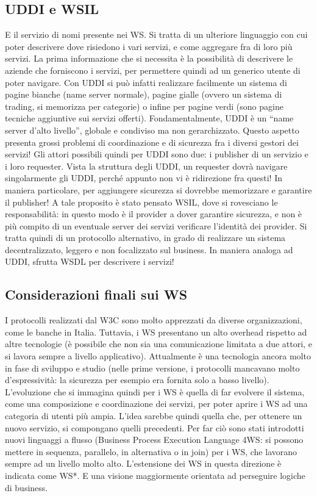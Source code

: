 \subsection{UDDI e WSIL}
E il servizio di nomi presente nei WS. Si tratta di un ulteriore linguaggio con cui poter descrivere dove risiedono i
vari servizi, e come aggregare fra di loro più servizi. La prima informazione che si necessita è la possibilità di
descrivere le aziende che forniscono i servizi, per permettere quindi ad un generico utente di poter navigare.
Con UDDI si può infatti realizzare facilmente un sistema di pagine bianche (name server normale), pagine gialle 
(ovvero un sistema di trading, si memorizza per categorie) o infine per pagine verdi (sono pagine tecniche aggiuntive
sui servizi offerti). Fondamentalmente, UDDI è un ``name server d'alto livello'', globale e condiviso ma non
gerarchizzato. Questo aspetto presenta grossi problemi di coordinazione e di sicurezza fra i diversi gestori dei 
servizi!
Gli attori possibili quindi per UDDI sono due: i publisher di un servizio e i loro requester. Vista la struttura degli
UDDI, un requester dovrà navigare singolarmente gli UDDI, perché appunto non vi è ridirezione fra questi! In maniera
particolare, per aggiungere sicurezza si dovrebbe memorizzare e garantire il publisher!
A tale proposito è stato pensato WSIL, dove si rovesciano le responsabilità: in questo modo è il provider a dover
garantire sicurezza, e non è più compito di un eventuale server dei servizi verificare l'identità dei provider. Si
tratta quindi di un protocollo alternativo, in grado di realizzare un sistema decentralizzato, leggero e non 
focalizzato sul business. In maniera analoga ad UDDI, sfrutta WSDL per descrivere i servizi!
\subsection{Considerazioni finali sui WS}
I protocolli realizzati dal W3C sono molto apprezzati da diverse organizzazioni, come le banche in Italia. Tuttavia,
i WS presentano un alto overhead rispetto ad altre tecnologie (è possibile che non sia una comunicazione limitata a 
due attori, e si lavora sempre a livello applicativo). Attualmente è una tecnologia ancora molto in fase di sviluppo 
e studio (nelle prime versione, i protocolli mancavano molto d'espressività: la sicurezza per esempio era fornita 
solo a basso livello).
L'evoluzione che si immagina quindi per i WS è quella di far evolvere il sistema, come una composizione e coordinazione
dei servizi, per poter aprire i WS ad una categoria di utenti più ampia. L'idea sarebbe quindi quella che, per
ottenere un nuovo servizio, si compongano quelli precedenti. Per far ciò sono stati introdotti nuovi linguaggi a 
flusso (Business Process Execution Language 4WS: si possono mettere in sequenza, parallelo, in alternativa o in join)
per i WS, che lavorano sempre ad un livello molto alto. L'estensione dei WS in questa direzione è indicata come WS*. 
E una visione maggiormente orientata ad perseguire logiche di business.
